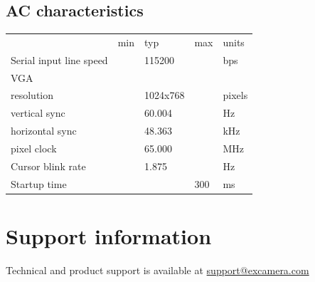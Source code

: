 \documentclass{article}
\newcommand{\heavyline}{\specialrule{1pt}{1pt}{1pt}}
\begin{document}
\subsection{AC characteristics}
\vspace{10 pt}

{\renewcommand{\arraystretch}{1.2}%
\begin{tabularx}{\linewidth}{XC{45pt}C{45pt}C{45pt}C{45pt}}
\heavyline
& min & typ & max & units \\ \heavyline

Serial input line speed & & 115200 & & bps \\ \hline

VGA & & & & \\
\hspace{10pt} resolution & & 1024x768 & & pixels \\
\hspace{10pt} vertical sync & & 60.004 & & Hz \\
\hspace{10pt} horizontal sync & & 48.363 & & kHz \\
\hspace{10pt} pixel clock & & 65.000 & & MHz \\ \hline

Cursor blink rate & & 1.875 & & Hz \\ \hline
Startup time & & & 300 & ms \\ \hline
\end{tabularx}}
\vspace{10 pt}

\section{Support information}

Technical and product support is available at
\href{mailto:support@excamera.com}{support@excamera.com}
\end{document}
